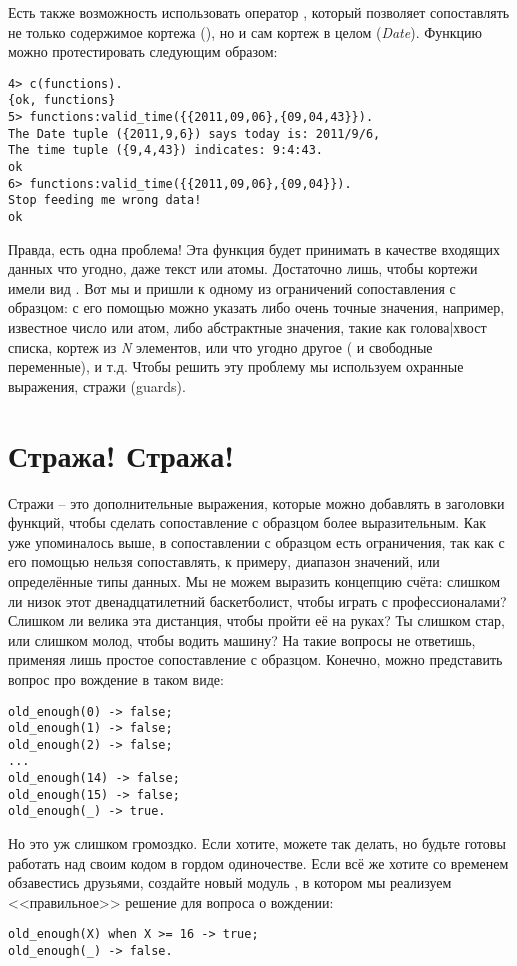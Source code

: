 Есть также возможность использовать оператор \ops{\strut=}, который позволяет сопоставлять не только содержимое кортежа (), но и сам кортеж в целом (\emph{Date}).
Функцию можно протестировать следующим образом:
\begin{lstlisting}[style=erlang]
4> c(functions).
{ok, functions}
5> functions:valid_time({{2011,09,06},{09,04,43}}).
The Date tuple ({2011,9,6}) says today is: 2011/9/6,
The time tuple ({9,4,43}) indicates: 9:4:43.
ok
6> functions:valid_time({{2011,09,06},{09,04}}).
Stop feeding me wrong data!
ok
\end{lstlisting}

Правда, есть одна проблема!
Эта функция будет принимать в качестве входящих данных что угодно, даже текст или атомы.
Достаточно лишь, чтобы кортежи имели вид .
Вот мы и пришли к одному из ограничений сопоставления с образцом: с его помощью можно указать либо очень точные значения, например, известное число или атом, либо абстрактные значения, такие как голова|хвост списка, кортеж из \emph{N} элементов, или что угодно другое (\ops{\strut\_} и свободные переменные), и т.д.
Чтобы решить эту проблему мы используем охранные выражения, стражи (guards). 
\section{Стража! Стража!}
\label{guards-guards}
Стражи \--- это дополнительные выражения, которые можно добавлять в заголовки функций, чтобы сделать сопоставление с образцом более выразительным.
Как уже упоминалось выше, в сопоставлении с образцом есть ограничения, так как с его помощью нельзя сопоставлять, к примеру, диапазон значений, или  определённые типы данных.
Мы не можем выразить концепцию счёта: слишком ли низок этот двенадцатилетний баскетболист, чтобы играть с профессионалами?
Слишком ли велика эта дистанция, чтобы пройти её на руках?
Ты слишком стар, или слишком молод, чтобы водить машину?
На такие вопросы не ответишь, применяя лишь простое сопоставление с образцом.
Конечно, можно представить вопрос про вождение в таком виде:
\begin{lstlisting}[style=erlang]
old_enough(0) -> false;
old_enough(1) -> false;
old_enough(2) -> false;
...
old_enough(14) -> false;
old_enough(15) -> false;
old_enough(_) -> true.
\end{lstlisting}

Но это уж слишком громоздко.
Если хотите, можете так делать, но будьте готовы работать над своим кодом в гордом одиночестве.
Если всё же хотите со временем обзавестись друзьями, создайте новый модуль , в котором мы реализуем <<правильное>> решение для вопроса о вождении:
\begin{lstlisting}[style=erlang]
old_enough(X) when X >= 16 -> true;
old_enough(_) -> false.
\end{lstlisting}

